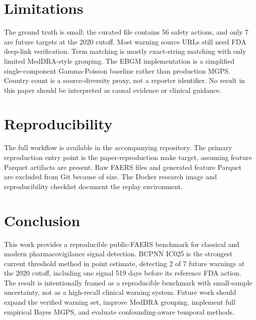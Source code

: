 \documentclass[12pt,onecolumn]{IEEEtran}
\begin{document}
\section{Limitations}
The ground truth is small: the curated file contains 56 safety actions, and
only 7 are future targets at the 2020 cutoff. Most warning source URLs still
need FDA deep-link verification. Term matching is mostly exact-string matching
with only limited MedDRA-style grouping. The EBGM implementation is a simplified
single-component Gamma-Poisson baseline rather than production MGPS. Country
count is a source-diversity proxy, not a reporter identifier. No result in this
paper should be interpreted as causal evidence or clinical guidance.

\section{Reproducibility}
The full workflow is available in the accompanying repository. The primary
reproduction entry point is the paper-reproduction make target, assuming feature
Parquet artifacts are present. Raw FAERS files and generated feature Parquet are
excluded from Git because of size. The Docker research image and
reproducibility checklist document the replay environment.

\section{Conclusion}
This work provides a reproducible public-FAERS benchmark for classical and
modern pharmacovigilance signal detection. BCPNN IC025 is the strongest current
threshold method in point estimate, detecting 2 of 7 future warnings at the
2020 cutoff, including one signal 519 days before its reference FDA action.
The result is intentionally framed as a reproducible benchmark with small-sample
uncertainty, not as a high-recall clinical warning system. Future work should
expand the verified warning set, improve MedDRA grouping, implement full
empirical Bayes MGPS, and evaluate confounding-aware temporal methods.



\end{document}
